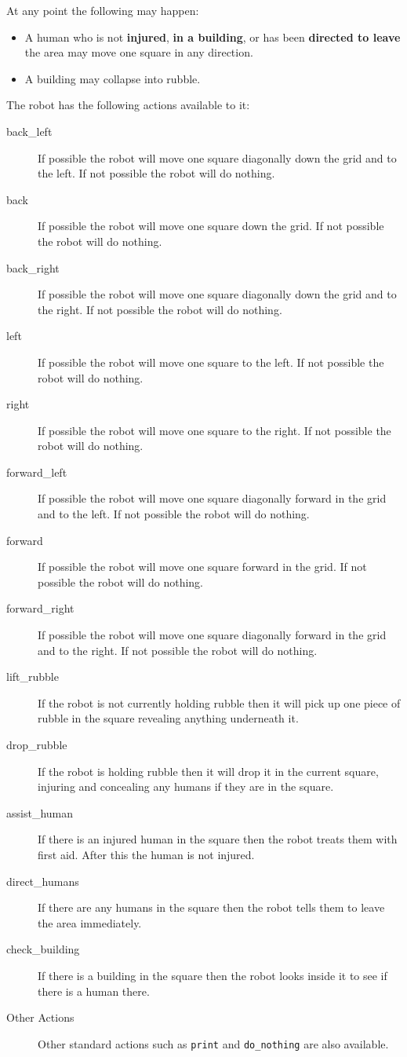 At any point the following may happen:
\begin{itemize}
\item A human who is not {\bf injured}, {\bf in a building}, or has been {\bf directed to leave} the area may move one square in any direction.
\item A building may collapse into rubble.
\end{itemize}

The robot  has the following actions available to it:
\begin{description}
\item[back\_left] If possible the robot will move one square diagonally down the grid and to the left.  If not possible the robot will do nothing.
\item[back] If possible the robot will move one square down the grid.  If not possible the robot will do nothing.
\item[back\_right] If possible the robot will move one square diagonally down the grid and to the right.  If not possible the robot will do nothing.
\item[left] If possible the robot will move one square to the left.  If not possible the robot will do nothing.
\item[right] If possible the robot will move one square to the right.  If not possible the robot will do nothing.
\item[forward\_left] If possible the robot will move one square diagonally forward in the grid and to the left.  If not possible the robot will do nothing.
\item[forward] If possible the robot will move one square forward in the grid.  If not possible the robot will do nothing.
\item[forward\_right] If possible the robot will move one square diagonally forward in the grid and to the right.  If not possible the robot will do nothing.
\item[lift\_rubble] If the robot is not currently holding rubble then it will pick up one piece of rubble in the square revealing anything underneath it.
\item[drop\_rubble] If the robot is holding rubble then it will drop it in the current square, injuring and concealing any humans if they are in the square.
\item[assist\_human] If there is an injured human in the square then the robot treats them with first aid.  After this the human is not injured.
\item[direct\_humans] If there are any humans in the square then the robot tells them to leave the area immediately.
\item[check\_building] If there is a building in the square then the robot looks inside it to see if there is a human there.
\item[Other Actions] Other standard actions such as \texttt{print} and \texttt{do\_nothing} are also available.
\end{description}

